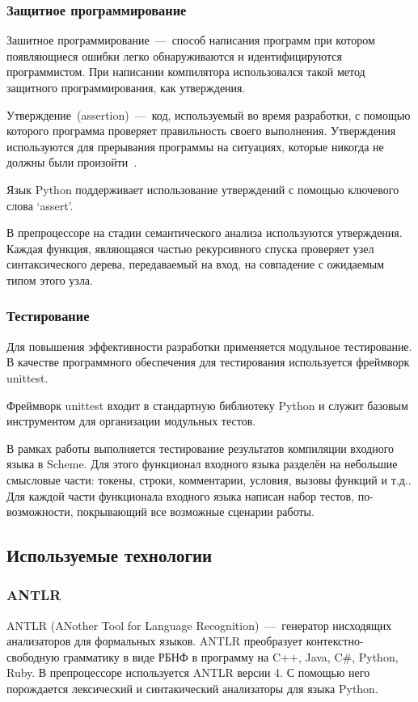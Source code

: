 \documentclass[12pt,a4paper,oneside]{extarticle}
\begin{document}
        \subsubsection{Защитное программирование}
            Зашитное программирование~---~способ написания программ при котором появляющиеся ошибки легко обнаруживаются и идентифицируются программистом.
            При написании компилятора использовался такой метод защитного программирования, как утверждения.

            Утверждение~(assertion)~---~код, используемый во время разработки, с помощью которого программа проверяет правильность своего выполнения. Утверждения используются для прерывания программы на ситуациях, которые никогда не должны были произойти~\cite{mcconnell}.

            Язык Python поддерживает использование утверждений с помощью ключевого слова `assert'. 

            В препроцессоре на стадии семантического анализа используются утверждения. Каждая функция, являющаяся частью рекурсивного спуска проверяет узел синтаксического дерева, передаваемый на вход, на совпадение с ожидаемым типом этого узла.

        \subsubsection{Тестирование}
            Для повышения эффективности разработки применяется модульное тестирование.
            В качестве программного обеспечения для тестирования используется фреймворк unittest.

            Фреймворк unittest входит в стандартную библиотеку Python и служит базовым инструментом для организации модульных тестов.

            В рамках работы выполняется тестирование результатов компиляции входного языка в Scheme.
            Для этого функционал входного языка разделён на небольшие смысловые части: токены, строки, комментарии, условия, вызовы функций и т.д..
            Для каждой части функционала входного языка написан набор тестов, по-возможности, покрывающий все возможные сценарии работы.
    \clearpage

    \subsection{Используемые технологии}
        \subsubsection{ANTLR}
            \label{subsec:antlr}
            ANTLR (ANother Tool for Language Recognition)~---~генератор нисходящих анализаторов для формальных языков.
            ANTLR преобразует контекстно-свободную грамматику в виде РБНФ в программу на C++, Java, C\#, Python, Ruby.
            В препроцессоре используется ANTLR версии 4.
            С помощью него порождается лексический и синтакический анализаторы для языка Python.
\end{document}
